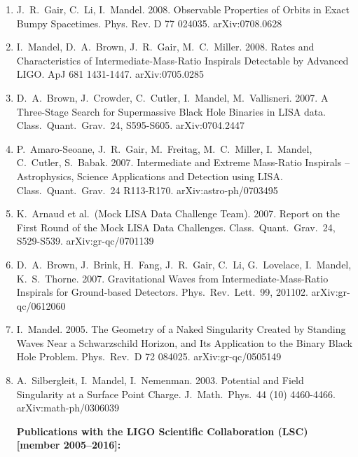 \documentclass[margin,line]{res}
\begin{document}
\begin{resume}
\begin{enumerate}
\item  J.~R.~Gair, C.~Li, I.~Mandel. 2008. Observable Properties of Orbits in 
Exact Bumpy Spacetimes.  Phys. Rev. D 77 024035.  arXiv:0708.0628

\item  I.~Mandel, D.~A.~Brown, J.~R.~Gair, M.~C.~Miller. 2008. Rates and 
Characteristics of Intermediate-Mass-Ratio Inspirals Detectable by 
Advanced LIGO.  ApJ 681 1431-1447. arXiv:0705.0285

\item  D.~A.~Brown, J.~Crowder, C.~Cutler, I.~Mandel, M.~Vallisneri. 2007.  A 
Three-Stage Search for Supermassive Black Hole Binaries in LISA data. 
Class.~Quant.~Grav.~24, S595-S605. arXiv:0704.2447

\item  P.~Amaro-Seoane, J.~R.~Gair, M.~Freitag, M.~C.~Miller, I.~Mandel,
C.~Cutler, S.~Babak. 2007.  Intermediate and Extreme Mass-Ratio  
Inspirals -- Astrophysics, Science Applications and Detection using
LISA.  Class.~Quant.~Grav.~24 R113-R170. arXiv:astro-ph/0703495

\item  K.~Arnaud et al.~(Mock LISA Data Challenge Team).  2007. Report on the 
First Round of the Mock LISA Data Challenges.  Class.~Quant.~Grav.~24, 
S529-S539. arXiv:gr-qc/0701139

\item  D.~A.~Brown, J.~Brink, H.~Fang, J.~R.~Gair, C.~Li, G.~Lovelace, 
I.~Mandel, K.~S.~Thorne. 2007.  Gravitational Waves from 
Intermediate-Mass-Ratio Inspirals for Ground-based Detectors. Phys.~Rev.~Lett.~99, 201102. arXiv:gr-qc/0612060

\item  I.~Mandel. 2005. The Geometry of a Naked Singularity Created by Standing 
Waves Near a Schwarzschild Horizon, and Its Application to the Binary 
Black Hole Problem. Phys.~Rev.~D 72 084025.  arXiv:gr-qc/0505149

\item  A.~Silbergleit, I.~Mandel, I.~Nemenman.  2003.  Potential and Field 
Singularity at a Surface Point Charge.  J.~Math.~Phys.~44 (10) 
4460-4466.  arXiv:math-ph/0306039

\vspace{0.2in}
{\bf \large Publications with the LIGO Scientific Collaboration (LSC) [member 2005--2016]:}



\end{enumerate}
\end{resume}
\end{document}
